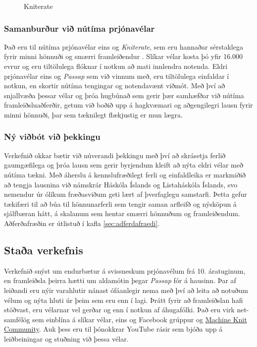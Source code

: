 \documentclass[a4paper,12pt,twoside]{article}
\begin{document}
\begin{figure}[H]
\begin{minipage}[b]{0.45\linewidth}
        \caption{Kniterate}
        \label{fig:kniterate}
    \end{minipage}
\end{figure}



\subsubsection{Samanburður við nútíma prjónavélar}
Það eru til nútíma prjónavélar eins og \emph{Kniterate}, sem eru hannaðar sérstaklega fyrir minni hönnuði og smærri framleiðendur \cite{kniterate}. Slíkar vélar kosta þó yfir 16.000 evrur og eru tiltölulega flóknar í notkun að mati innlendra notenda. Eldri prjónavélar eins og \textit{Passap} sem við vinnum með, eru tiltölulega einfaldar í notkun, en skortir nútíma tengingar og notendavænt viðmót. Með því að snjallvæða þessar vélar og þróa hugbúnað sem gerir þær samhæfðar við nútíma framleiðsluaðferðir, getum við boðið upp á hagkvæmari og aðgengilegri lausn fyrir minni hönnuði, þar sem tæknilegt flækjustig er mun lægra.

\subsubsection{Ný viðbót við þekkingu}
Verkefnið okkar bætir við núverandi þekkingu með því að skrásetja ferlið gaumgæfilega og þróa lausn sem gerir byrjendum kleift að nýta eldri vélar með nútíma tækni. Með áherslu á kennslufræðilegt ferli og einfaldleika er markmiðið að tengja lausnina við námskrár Háskóla Íslands og Listaháskóla Íslands, svo nemendur úr ólíkum fræðasviðum geti lært af þverfaglegu samstarfi. Þetta gefur tækifæri til að búa til hönnunarferli sem tengir saman arfleifð og nýsköpun á sjálfbæran hátt, á skalanum sem hentar smærri hönnuðum og framleiðendum. Aðferðafræðin er útlistuð í kafla \ref{sec:adferdafraedi}.

\subsection{Staða verkefnis}
Verkefnið snýst um endurbætur á svissneskum prjónavélum frá 10. áratuginum, en framleiðsla þeirra hætti um aldamótin þegar \textit{Passap} fór á hausinn. Þar af leiðandi eru nýir varahlutir nánast ófáanlegir nema með því að leita að notuðum vélum og nýta hluti úr þeim sem eru enn í lagi. Þrátt fyrir að framleiðslan hafi stöðvast, eru vélarnar vel gerðar og enn í notkun af áhugafólki. Það eru virk net-samfélög sem einblína á slíkar vélar, eins og Facebook grúppur og \href{https://www.mkc.community/}{Machine Knit Community}. Auk þess eru til þónokkrar YouTube rásir sem bjóða upp á leiðbeiningar og stuðning við þessa vélar.
\end{document}
